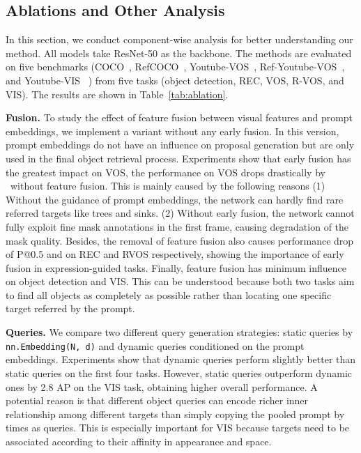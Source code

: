 \documentclass[10pt,twocolumn,letterpaper]{article}
\newcommand{\mjf}{}
\begin{document}
\subsection{Ablations and Other Analysis}
\label{sec:ablation}

In this section, we conduct component-wise analysis for better understanding our method. All models take ResNet-50 as the backbone. The methods are evaluated on five benchmarks (COCO~\cite{COCO}, RefCOCO~\cite{RefCOCO&plus}, Youtube-VOS~\cite{YoutubeVOS}, Ref-Youtube-VOS~\cite{URVOS}, and Youtube-VIS ~\cite{VIS}) from five tasks (object detection, REC, VOS, R-VOS, and VIS). The results are shown in Table~\ref{tab:ablation}. 

\textbf{Fusion.} To study the effect of feature fusion between visual features and prompt embeddings, we implement a variant without any early fusion. In this version, prompt embeddings do not have an influence on proposal generation but are only used in the final object retrieval process. Experiments show that early fusion has the greatest impact on VOS, the performance on VOS drops drastically by  \mjf\ without feature fusion. This is mainly caused by the following reasons (1) Without the guidance of prompt embeddings, the network can hardly find rare referred targets like trees and sinks. (2) Without early fusion, the network cannot fully exploit fine mask annotations in the first frame, causing degradation of the mask quality. Besides, the removal of feature fusion also causes performance drop of  P@0.5 and  \mjf on REC and RVOS respectively, showing the importance of early fusion in expression-guided tasks. Finally, feature fusion has minimum influence on object detection and VIS. This can be understood because both two tasks aim to find all objects as completely as possible rather than locating one specific target referred by the prompt. 

\textbf{Queries.} We compare two different query generation strategies: static queries by \texttt{nn.Embedding(N, d)} and dynamic queries conditioned on the prompt embeddings. Experiments show that dynamic queries perform slightly better than static queries on the first four tasks. However, static queries outperform dynamic ones by 2.8 AP on the VIS task, obtaining higher overall performance. A potential reason is that  different object queries can encode richer inner relationship among different targets than simply copying the pooled prompt by  times as queries. This is especially important for VIS because targets need to be associated according to their affinity in appearance and space.
\end{document}
